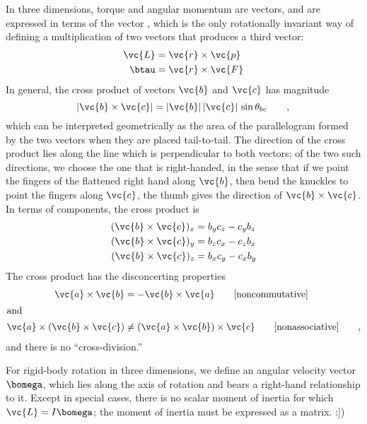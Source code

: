 \begin{summary}
\begin{summarytext}
	In three dimensions, torque and angular momentum are vectors, and are expressed
	in terms of the vector , which is the only
	rotationally invariant way of defining a multiplication of two vectors
	that produces a third vector:
	\begin{align*}
		\vc{L}	&= \vc{r}\times\vc{p}\\
		\btau	&= \vc{r}\times\vc{F}
	\end{align*}
	In general, the cross product of vectors $\vc{b}$ and $\vc{c}$ has
	magnitude
	\begin{equation*}
		|\vc{b}\times\vc{c}|	= |\vc{b}|\,|\vc{c}|\,\sin\theta_{bc} \qquad ,\\
	\end{equation*}
	which can be interpreted geometrically as the area of the parallelogram
	formed by the two vectors when they are placed tail-to-tail.
	The direction of the cross product lies along the line which is perpendicular
	to both vectors; of the two such directions, we choose the one that is right-handed,
	in the sense that if we point the fingers of the flattened right hand along
	$\vc{b}$, then bend the knuckles to point the fingers along $\vc{c}$, the thumb
	gives the direction of $\vc{b}\times\vc{c}$. In terms of components, the
	cross product is
	\begin{align*}
	(\vc{b}\times\vc{c})_x	&=  b_yc_z - c_yb_z\\
	(\vc{b}\times\vc{c})_y	&=  b_zc_x - c_zb_x\\
	(\vc{b}\times\vc{c})_z	&=  b_xc_y - c_xb_y
	\end{align*}
	The  cross product 
	has the disconcerting properties
	\begin{align*}
		\vc{a}\times\vc{b} &= -\vc{b}\times\vc{a} \qquad \text{[noncommutative]}\\
		\intertext{and}
		\vc{a}\times(\vc{b}\times\vc{c}) &\ne (\vc{a}\times\vc{b})\times\vc{c} \qquad \text{[nonassociative]} \qquad ,
	\end{align*}
	and there is no ``cross-division.''
	
	For rigid-body rotation in three dimensions, we define an angular velocity
	vector $\bomega$, which lies along the axis of rotation and bears a right-hand
	relationship to it. Except in special cases, there is no scalar moment of
	inertia for which $\vc{L}=I\bomega$; the moment of inertia must be expressed
	as a matrix.
:])

\end{summarytext}

\end{summary}
